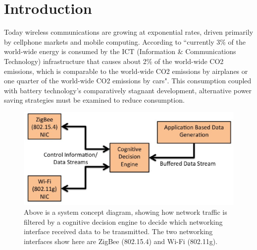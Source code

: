 \documentclass[conference]{IEEEtran}
\begin{document}
\section{Introduction}

Today wireless communications are growing at exponential rates, driven primarily by cellphone markets and mobile computing\cite{two}.  According to \cite{three} ``currently 3\% of the world-wide energy is consumed by the ICT (Information \& Communications Technology) infrastructure that causes about 2\% of the world-wide CO2 emissions, which is comparable to the world-wide CO2 emissions by airplanes or one quarter of the world-wide CO2 emissions by cars".  This consumption coupled with battery technology's comparatively stagnant development\cite{five}, alternative power saving strategies must be examined to reduce consumption.  

\begin{figure}
\begin{center}
\includegraphics[scale=0.35]{concept_diagram.eps}
\caption{Above is a system concept diagram, showing how network traffic is filtered by a cognitive decision engine to decide which networking interface received data to be transmitted.  The two networking interfaces show here are ZigBee (802.15.4) and Wi-Fi (802.11g).}
\end{center}
\end{figure}
\end{document}
